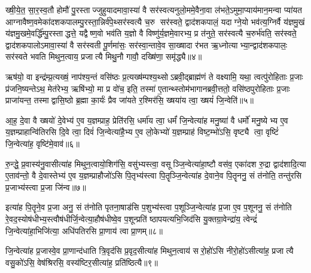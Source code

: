 ख्षी॒ये॒त॒ सा॒र॒स्व॒तौ होमौ॑ पु॒रस्ताज्जुहुयादमावा॒स्या॑ वै सर॑स्वत्यनुलो॒ममे॒वैना॒वा ल॑भते॒ऽमुमा॒प्याय॑मान॒मन्वा प्या॑यत आग्नावैष्ण॒वमेका॑दशकपालम्पु॒रस्ता॒न्निर्व॑पे॒थ्सर॑स्वत्यै च॒रु सर॑स्वते॒ द्वाद॑शकपालं॒ यदाग्ने॒यो भव॑त्य॒ग्निर्वै य॑ज्ञमु॒खं य॑ज्ञमु॒खमे॒वर्द्धि॑म्पु॒रस्ताद्धत्ते॒ यद्वैष्ण॒वो भव॑ति य॒ज्ञो वै विष्णु॑र्य॒ज्ञमे॒वारभ्य॒ प्र त॑नुते॒ सर॑स्वत्यै च॒रुर्भ॑वति॒ सर॑स्वते॒ द्वाद॑शकपालोऽमावा॒स्या॑ वै सर॑स्वती पू॒र्णमा॑सः॒ सर॑स्वा॒न्तावे॒व सा॒ख्षादा र॑भत ऋ॒ध्नोत्याभ्या॒न्द्वाद॑शकपालः॒ सर॑स्वते भवति मिथुन॒त्वाय॒ प्रजात्यै मिथु॒नौ गावौ॒ दख्षि॑णा॒ समृ॑द्ध्यै॥४॥

{\anuvakamend[{वर्च॑सा॒ वै ते द॑र्\mbox{}शपूर्णमा॒सावप॑ तनुते॒ सर॑स्वत्यै॒ पञ्च॑विशतिश्च॥१॥}]}

ऋष॑यो॒ वा इन्द्र॑म्प्र॒त्यख्षं॒ नाप॑श्य॒न्तं वसि॑ष्ठः प्र॒त्यख्ष॑म्पश्य॒थ्सोऽब्रवी॒द्ब्राह्म॑णं ते वक्ष्यामि॒ यथा॒ त्वत्पु॑रोहिताः प्र॒जाः प्र॑जनि॒ष्यन्तेऽथ॒ मेत॑रेभ्य॒ ऋषि॑भ्यो॒ मा प्र वो॑च॒ इति॒ तस्मा॑ ए॒तान्थ्स्तोम॑भागानब्रवी॒त्ततो॒ वसि॑ष्ठपुरोहिताः प्र॒जाः प्राजा॑यन्त॒ तस्माद्वासि॒ष्ठो ब्र॒ह्मा का॒र्यः॑ प्रैव जा॑यते र॒श्मिर॑सि॒ ख्षया॑य त्वा॒ ख्षयं॑ जि॒न्वेति॑॥५॥

आ॒ह॒ दे॒वा वै ख्षयो॑ दे॒वेभ्य॑ ए॒व य॒ज्ञम्प्राह॒ प्रेति॑रसि॒ धर्मा॑य त्वा॒ धर्मं॑ जि॒न्वेत्या॑ह मनु॒ष्या॑ वै धर्मो॑ मनु॒ष्येभ्य ए॒व य॒ज्ञम्प्राहान्वि॑तिरसि दि॒वे त्वा॒ दिवं॑ जि॒न्वेत्या॑है॒भ्य ए॒व लो॒केभ्यो॑ य॒ज्ञम्प्राह॑ विष्ट॒म्भो॑ऽसि॒ वृष्ट्यै त्वा॒ वृष्टिं॑ जि॒न्वेत्या॑ह॒ वृष्टि॑मे॒वाव॑॥६॥

रु॒न्द्धे॒ प्र॒वास्य॑नु॒वासीत्या॑ह मिथुन॒त्वायो॒शिग॑सि॒ वसु॑भ्यस्त्वा॒ वसूञ्जि॒न्वेत्या॑हा॒ष्टौ वस॑व॒ एका॑दश रु॒द्रा द्वाद॑शादि॒त्या ए॒ताव॑न्तो॒ वै दे॒वास्तेभ्य॑ ए॒व य॒ज्ञम्प्राहौजो॑ऽसि पि॒तृभ्य॑स्त्वा पि॒तॄञ्जि॒न्वेत्या॑ह दे॒वाने॒व पि॒तॄननु॒ सं त॑नोति॒ तन्तु॑रसि प्र॒जाभ्य॑स्त्वा प्र॒जा जि॑न्व॥७॥

इत्या॑ह पि॒तॄने॒व प्र॒जा अनु॒ सं त॑नोति पृतना॒षाड॑सि प॒शुभ्य॑स्त्वा प॒शूञ्जि॒न्वेत्या॑ह प्र॒जा ए॒व प॒शूननु॒ सं त॑नोति रे॒वद॒स्योष॑धीभ्य॒स्त्वौष॑धीर्जि॒न्वेत्या॒हौष॑धीष्वे॒व प॒शून्प्रति॑ ष्ठापयत्यभि॒जिद॑सि यु॒क्तग्रा॒वेन्द्रा॑य॒ त्वेन्द्रं॑ जि॒न्वेत्या॑हा॒भिजि॑त्या॒ अधि॑पतिरसि प्रा॒णाय॑ त्वा प्रा॒णम्॥८॥

जि॒न्वेत्या॑ह प्र॒जास्वे॒व प्रा॒णान्द॑धाति त्रि॒वृद॑सि प्र॒वृद॒सीत्या॑ह मिथुन॒त्वाय॑ सरो॒हो॑ऽसि नीरो॒हो॑ऽसीत्या॑ह॒ प्रजात्यै वसु॒को॑ऽसि॒ वेष॑श्रिरसि॒ वस्य॑ष्टिर॒सीत्या॑ह॒ प्रति॑ष्ठित्यै॥९॥

{\anuvakamend[{जि॒न्वेत्यव॑ प्र॒जा जि॑न्व प्रा॒णन्त्रि॒ꣳ॒शच्च॑॥२॥}]}

